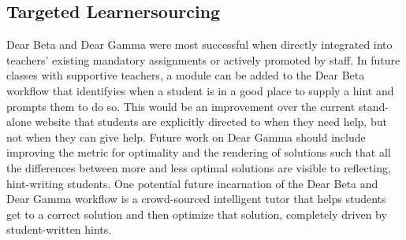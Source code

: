 \subsection{Targeted Learnersourcing}

Dear Beta and Dear Gamma were most successful when directly integrated into teachers' existing mandatory assignments or actively promoted by staff. In future classes with supportive teachers, a module can be added to the Dear Beta workflow that identifyies when a student is in a good place to supply a hint and prompts them to do so. This would be an improvement over the current stand-alone website that students are explicitly directed to when they need help, but not when they can give help. Future work on Dear Gamma should include improving the metric for optimality and the rendering of solutions such that all the differences between more and less optimal solutions are visible to reflecting, hint-writing students. One potential future incarnation of the Dear Beta and Dear Gamma workflow is a crowd-sourced intelligent tutor that helps students get to a correct solution and then optimize that solution, completely driven by student-written hints. %

